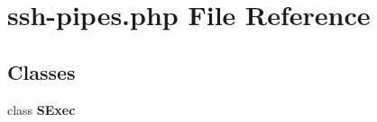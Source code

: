 \section{ssh-pipes.php File Reference}
\label{ssh-pipes_8php}
\subsection*{Classes}
\begin{CompactItemize}
\item 
class {\bf SExec}
\end{CompactItemize}

